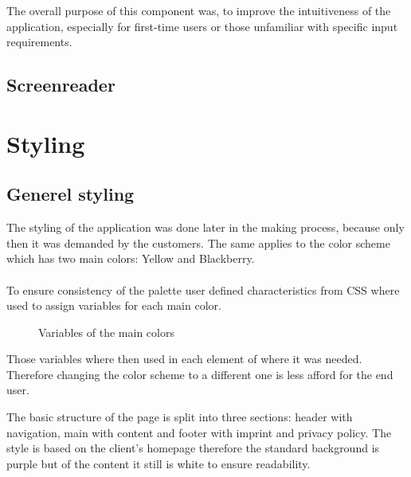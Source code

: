 \documentclass[a4paper,12pt]{report}
\begin{document}
The overall purpose of this component was, to improve the intuitiveness of the application, especially for first-time users or those unfamiliar with specific input requirements.
\subsection{Screenreader}
\section{Styling}
\subsection{Generel styling}
The styling of the application was done later in the making process, because only then it was demanded by the customers. The same applies to the color scheme which has two main colors: Yellow and Blackberry. \\ \\
To ensure consistency of the palette user defined characteristics from CSS where used to assign variables for each main color. \parencite{csscolorvariables}
\begin{figure}[h!]
	\caption{Variables of the main colors}
	\label{fig:user_defined_characteristics}
\end{figure}

Those variables where then used in each element of where it was needed. Therefore changing the color scheme to a different one is less afford for the end user.

The basic structure of the page is split into three sections: header with navigation, main with content and footer with imprint and privacy policy. The style is based on the client's homepage therefore the standard background is purple but of the content it still is white to ensure readability. \parencite{lmppage}
\end{document}
